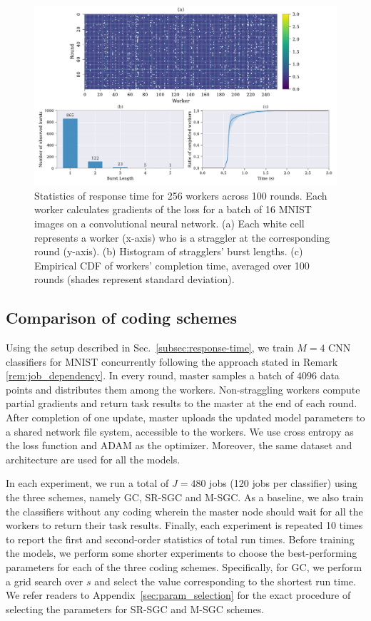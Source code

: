 \begin{figure}[h]
    \centering
    \includegraphics[width=\textwidth]{figures/ch2/fig1.pdf}
    \caption{Statistics of response time for 256 workers across 100 rounds. Each worker calculates gradients of the loss for a batch of 16 MNIST images on a convolutional neural network. (a) Each white cell represents a worker (x-axis) who is a straggler at the corresponding round (y-axis). (b) Histogram of stragglers' burst lengths. (c) Empirical CDF of workers' completion time, averaged over 100 rounds (shades represent standard deviation).}
    \label{fig:4-1}
\end{figure}

\subsection{Comparison of coding schemes}

Using the setup described in Sec.~\ref{subsec:response-time}, we train $M=4$ CNN classifiers for MNIST concurrently following the approach stated in Remark \ref{rem:job_dependency}. In every round, master samples a batch of $4096$ data points and distributes them among the workers. Non-straggling workers compute partial gradients and return task results to the master at the end of each round. After completion of one update, master uploads the updated model parameters to a shared network file system, accessible to the workers.  We use cross entropy as the loss function and ADAM as the optimizer. Moreover, the same dataset and architecture are used for all the models.

In each experiment, we run a total of $J=480$ jobs (120 jobs per classifier) using the three schemes, namely GC, SR-SGC and M-SGC. As a baseline, we also train the classifiers without any coding wherein the master node should wait for all the workers to return their task results. Finally, each experiment is repeated 10 times to report the first and second-order statistics of total run times. Before training the models, we perform some shorter experiments to choose the best-performing parameters for each of the three coding schemes. Specifically, for GC, we perform a grid search over $s$ and select the value corresponding to the shortest run time. We refer readers to Appendix~\ref{sec:param_selection} for the exact procedure of selecting the parameters for SR-SGC and M-SGC schemes.


